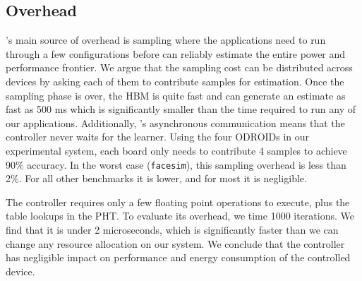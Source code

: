
\subsection{Overhead}
\SYSTEM{}'s main source of overhead is sampling where the applications
need to run through a few configurations before \SYSTEM{} can reliably
estimate the entire power and performance frontier. We argue that the
sampling cost can be distributed across devices by asking each of them
to contribute samples for estimation. Once the sampling phase is over,
the HBM is quite fast and can generate an estimate as fast as 500 ms
which is significantly smaller than the time required to run any of
our applications.  Additionally, \SYSTEM{}'s asynchronous
communication means that the controller never waits for the learner.
Using the four ODROIDs in our experimental system, each board only
needs to contribute 4 samples to achieve 90\% accuracy.  In the worst
case (\texttt{facesim}), this sampling overhead is less than 2\%.  For
all other benchmarks it is lower, and for most it is negligible.

The controller requires only a few floating point operations to
execute, plus the table lookups in the PHT.  To evaluate its overhead,
we time 1000 iterations.  We find that it is under 2 microseconds,
which is significantly faster than we can change any resource
allocation on our system.  We conclude that the controller has
negligible impact on performance and energy consumption of the
controlled device.
